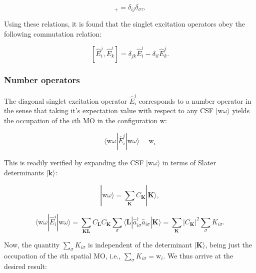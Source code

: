 \documentclass[12pt,a4paper]{report}
\begin{document}
\begin{equation}
  [ \hat{a}_{i\sigma}^{\dagger}, \hat{a}_{j\tau} ]_{+} = \delta_{ij}
  \delta_{\sigma\tau}.
\end{equation}

\noindent
Using these relations, it is found that the singlet excitation
operators obey the following commutation relation:

\begin{equation}\label{eq:generator_commutation}
  [\hat{E}_{i}^{j}, \hat{E}_{k}^{l}] = \delta_{jk} \hat{E}_{i}^{l} -
  \delta_{il} \hat{E}_{k}^{j}.
\end{equation}

\subsubsection{Number operators}\label{sec:number_operators}
The diagonal singlet excitation operator $\hat{E}_{i}^{i}$ corresponds
to a number operator in the sense that taking it's expectation value
with respect to any CSF $| \text{w} \omega \rangle$ yields the
occupation of the $i$th MO in the configuration $\text{w}$:

\begin{equation}\label{eq:number_operator}
  \langle \text{w} \omega | \hat{E}_{i}^{i} | \text{w} \omega \rangle
  = \text{w}_{i}
\end{equation}

This is readily verified by expanding the CSF $| \text{w} \omega
\rangle$ in terms of Slater determinants $| \boldsymbol{k} \rangle$:

\begin{equation}
  | \text{w} \omega \rangle = \sum_{\boldsymbol{K}} C_{\boldsymbol{K}}
  | \boldsymbol{K} \rangle,
\end{equation}

\begin{equation}
    \langle \text{w} \omega | \hat{E}_{i}^{i} | \text{w} \omega
    \rangle = \sum_{\boldsymbol{KL}} C_{\boldsymbol{L}}
    C_{\boldsymbol{K}} \sum_{\sigma} \langle \boldsymbol{L}
    |\hat{a}_{i\sigma}^{\dagger} \hat{a}_{i\sigma} | \boldsymbol{K}
    \rangle = \sum_{\boldsymbol{K}} |C_{\boldsymbol{K}}|^{2}
    \sum_{\sigma} K_{i\sigma}.
\end{equation}

\noindent
Now, the quantity $\sum_{\sigma} K_{i\sigma}$ is independent of the
determinant $| \boldsymbol{K} \rangle$, being just the occupation of
the $i$th spatial MO, i.e., $\sum_{\sigma} K_{i\sigma} =
\text{w}_{i}$. We thus arrive at the desired result:
\end{document}
